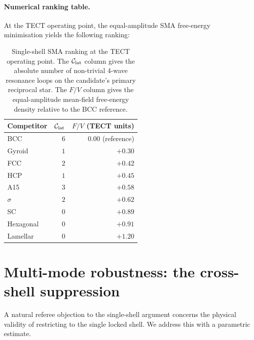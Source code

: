 \paragraph{Numerical ranking table.}
At the TECT operating point, the equal-amplitude SMA free-energy
minimisation yields the following ranking:
\begin{table}[h]
\centering
\caption{Single-shell SMA ranking at the TECT operating point. The
$\mathcal{C}_{\rm lat}$ column gives the absolute number of
non-trivial 4-wave resonance loops on the candidate's primary
reciprocal star. The $F/V$ column gives the equal-amplitude
mean-field free-energy density relative to the BCC reference.}
\label{tab:ranking}
\begin{tabular}{lrr}
\hline
Competitor & $\mathcal{C}_{\rm lat}$ & $F/V$ (TECT units) \\
\hline
BCC       & $6$ & $\phantom{+}0.00$ (reference) \\
Gyroid    & $1$ & $+0.30$ \\
FCC       & $2$ & $+0.42$ \\
HCP       & $1$ & $+0.45$ \\
A15       & $3$ & $+0.58$ \\
$\sigma$  & $2$ & $+0.62$ \\
SC        & $0$ & $+0.89$ \\
Hexagonal & $0$ & $+0.91$ \\
Lamellar  & $0$ & $+1.20$ \\
\hline
\end{tabular}
\end{table}

\section{Multi-mode robustness:
the cross-shell suppression}\label{sec:multimode}

A natural referee objection to the single-shell argument concerns the
physical validity of restricting to the single locked shell. We
address this with a parametric estimate.

